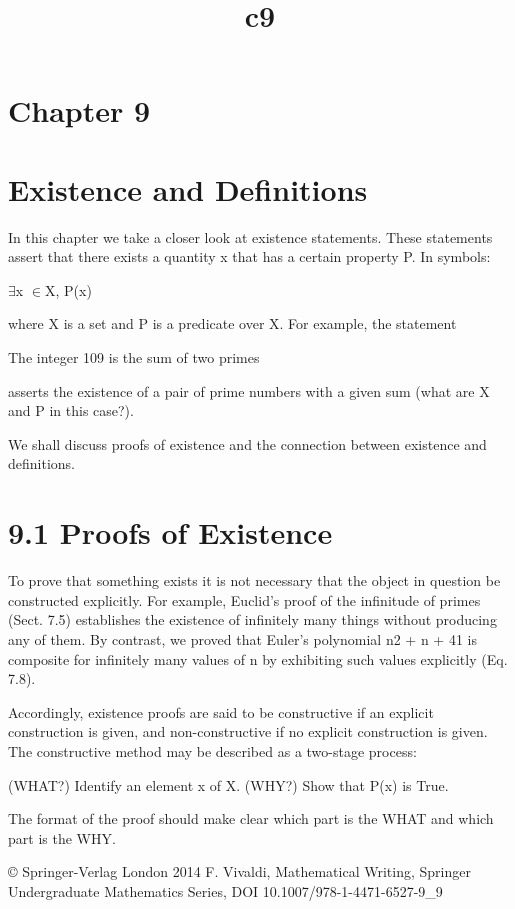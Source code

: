 \documentclass[11pt]{article}
\title{c9}
\date{}
\theoremstyle{plain}
\theoremstyle{definition}
\begin{document}
\maketitle

\section{Chapter 9}

\section{Existence and Definitions}

In this chapter we take a closer look at existence statements. These statements assert that there exists a quantity x that has a certain property P. In symbols:

$\exists$x $\in$X, P(x)

where X is a set and P is a predicate over X. For example, the statement

The integer 109 is the sum of two primes

asserts the existence of a pair of prime numbers with a given sum (what are X and P in this case?).

We shall discuss proofs of existence and the connection between existence and definitions.

\section{9.1 Proofs of Existence}

To prove that something exists it is not necessary that the object in question be constructed explicitly. For example, Euclid's proof of the infinitude of primes (Sect. 7.5) establishes the existence of infinitely many things without producing any of them. By contrast, we proved that Euler's polynomial n2 + n + 41 is composite for infinitely many values of n by exhibiting such values explicitly (Eq. 7.8).

Accordingly, existence proofs are said to be constructive if an explicit construction is given, and non-constructive if no explicit construction is given. The constructive method may be described as a two-stage process:

(WHAT?) Identify an element x of X. (WHY?) Show that P(x) is True.

The format of the proof should make clear which part is the WHAT and which part is the WHY.

© Springer-Verlag London 2014 F. Vivaldi, Mathematical Writing, Springer Undergraduate Mathematics Series, DOI 10.1007/978-1-4471-6527-9\_9
\end{document}
